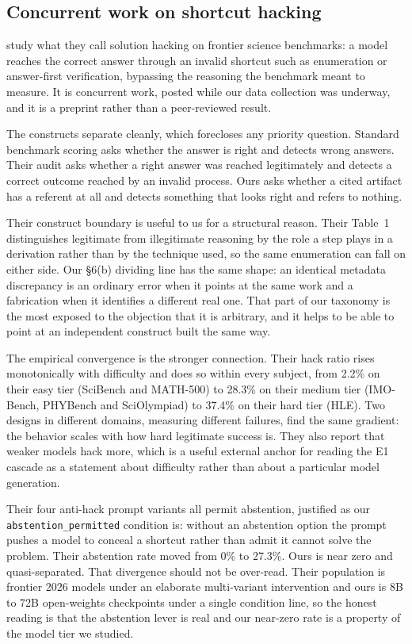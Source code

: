 \subsection{Concurrent work on shortcut hacking}

\citet{solutionhacking2026} study what they call solution hacking on frontier
science benchmarks: a model reaches the correct answer through an invalid
shortcut such as enumeration or answer-first verification, bypassing the
reasoning the benchmark meant to measure. It is concurrent work, posted while
our data collection was underway, and it is a preprint rather than a
peer-reviewed result.

The constructs separate cleanly, which forecloses any priority question. Standard
benchmark scoring asks whether the answer is right and detects wrong answers.
Their audit asks whether a right answer was reached legitimately and detects a
correct outcome reached by an invalid process. Ours asks whether a cited artifact
has a referent at all and detects something that looks right and refers to
nothing.

Their construct boundary is useful to us for a structural reason. Their Table~1
distinguishes legitimate from illegitimate reasoning by the role a step plays in
a derivation rather than by the technique used, so the same enumeration can fall
on either side. Our §6(b) dividing line has the same shape: an identical
metadata discrepancy is an ordinary error when it points at the same work and a
fabrication when it identifies a different real one. That part of our taxonomy is
the most exposed to the objection that it is arbitrary, and it helps to be able
to point at an independent construct built the same way.

The empirical convergence is the stronger connection. Their hack ratio rises
monotonically with difficulty and does so within every subject, from 2.2\% on
their easy tier (SciBench and MATH-500) to 28.3\% on their medium tier
(IMO-Bench, PHYBench and SciOlympiad) to 37.4\% on their hard tier (HLE). Two
designs in different domains, measuring different failures, find the same
gradient: the behavior scales with how hard legitimate success is. They also
report that weaker models hack more, which is a useful external anchor for
reading the E1 cascade as a statement about difficulty rather than about a
particular model generation.

Their four anti-hack prompt variants all permit abstention, justified as our
\texttt{abstention\_permitted} condition is: without an abstention option the
prompt pushes a model to conceal a shortcut rather than admit it cannot solve
the problem. Their abstention rate moved from 0\% to 27.3\%. Ours is near zero
and quasi-separated. That divergence should not be over-read. Their population
is frontier 2026 models under an elaborate multi-variant intervention and ours
is 8B to 72B open-weights checkpoints under a single condition line, so the
honest reading is that the abstention lever is real and our near-zero rate is a
property of the model tier we studied.


